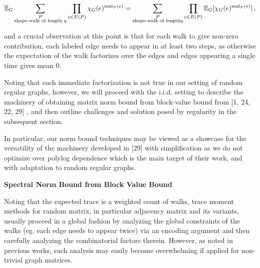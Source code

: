 \documentclass[10pt,a4paper]{article}
\begin{document}
\[\begin{gathered}
\mathbb{E}_{G}\sum_{\begin{subarray}{c}P\\
\text{shape-walk of length }q\end{subarray}}\prod_{e\in E(P)}\chi_{G}(e)^{\text{mul}_{P}(e)}=\sum_{\begin{subarray}{c}P\\
\text{shape-walk of length}q\end{subarray}}\prod_{e\in E(P)}\mathbb{E}_{G}[\chi_{G}(e)^{\text{mul}_{P}(e)}]\,,
\end{gathered}\]


and a crucial observation at this point
is that for each walk to give non-zero contribution, each labeled edge needs to appear in at least two steps, as otherwise the expectation of the walk factorizes over the edges and edges appearing a single time gives mean $0$.\par




Noting that such immediate factorization is not true in our setting of random regular graphs, however, we will proceed with the i.i.d. setting to describe the machinery of obtaining matrix norm bound from block-value bound from [1, 24, 22, 29] , and then outline challenges and solution posed by regularity in the subsequent section.\par




In particular, our norm bound techniques may be viewed as a showcase for the versatility of the machinery developed in [29] with simplification as we do not optimize over polylog dependence which is the main target of their work, and with adaptation to random regular graphs.\par





\par\medskip\noindent\textbf{Spectral Norm Bound from Block Value Bound}\par




Noting that the expected trace is a weighted count of walks, trace moment methods for random matrix, in particular adjacency matrix and its variants, usually proceed in a global fashion by analyzing the global constraints of the walks (eg. each edge needs to appear twice) via an encoding argument and then carefully analyzing the combinatorial factors therein. However, as noted in previous works, such analysis may easily become overwhelming if applied for non-trivial graph matrices.\par
\end{document}
